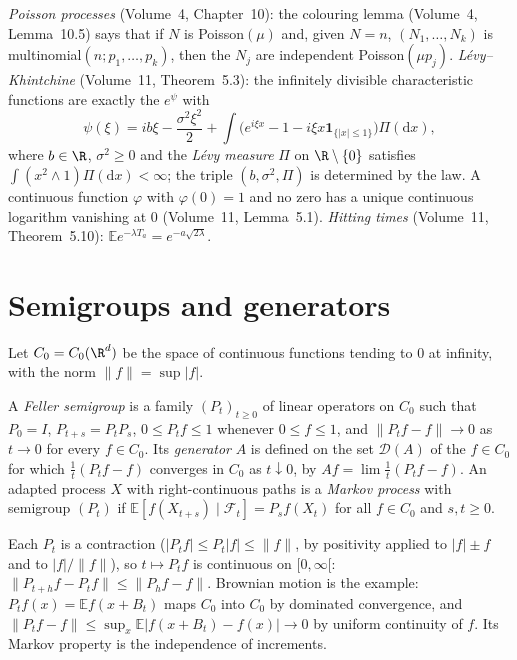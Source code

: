 \begin{reminder}
\emph{Poisson processes} (Volume~4, Chapter~10): the colouring lemma (Volume~4, Lemma~10.5) says that if $N$ is Poisson$(\mu)$ and, given $N=n$, $(N_1,\dots,N_k)$ is multinomial$(n;p_1,\dots,p_k)$, then the $N_j$ are
independent Poisson$(\mu p_j)$. \emph{L\'evy--Khintchine} (Volume~11, Theorem~5.3): the infinitely divisible characteristic functions are exactly the $e^{\psi}$ with
\[
\psi(\xi)=ib\xi-\frac{\sigma^2\xi^2}2+\int\bigl(e^{i\xi x}-1-i\xi x\mathbf 1_{\{|x|\le1\}}\bigr)\Pi(\mathrm dx),
\]
where $b\in\R$, $\sigma^2\ge0$ and the \emph{L\'evy measure} $\Pi$ on $\R\setminus\{0\}$ satisfies $\int(x^2\wedge1)\Pi(\mathrm dx)<\infty$; the triple $(b,\sigma^2,\Pi)$ is determined by the law. A continuous function
$\varphi$ with $\varphi(0)=1$ and no zero has a unique continuous logarithm vanishing at $0$ (Volume~11, Lemma~5.1). \emph{Hitting times} (Volume~11, Theorem~5.10): $\mathbb Ee^{-\lambda T_a}=e^{-a\sqrt{2\lambda}}$.
\end{reminder}

\section{Semigroups and generators}

Let $C_0=C_0(\R^d)$ be the space of continuous functions tending to $0$ at infinity, with the norm $\|f\|=\sup|f|$.

\begin{definition}\label{def:feller}
A \emph{Feller semigroup} is a family $(P_t)_{t\ge0}$ of linear operators on $C_0$ such that $P_0=I$, $P_{t+s}=P_tP_s$, $0\le P_tf\le1$ whenever $0\le f\le1$, and $\|P_tf-f\|\to0$ as $t\to0$ for every
$f\in C_0$. Its \emph{generator} $A$ is defined on the set $\mathcal D(A)$ of the $f\in C_0$ for which $\frac1t(P_tf-f)$ converges in $C_0$ as $t\downarrow0$, by $Af=\lim\frac1t(P_tf-f)$. An adapted process $X$ with
right-continuous paths is a \emph{Markov process} with semigroup $(P_t)$ if $\mathbb E[f(X_{t+s})\mid\mathcal F_t]=P_sf(X_t)$ for all $f\in C_0$ and $s,t\ge0$.
\end{definition}

Each $P_t$ is a contraction ($|P_tf|\le P_t|f|\le\|f\|$, by positivity applied to $|f|\pm f$ and to $|f|/\|f\|$), so $t\mapsto P_tf$ is continuous on $[0,\infty[$: $\|P_{t+h}f-P_tf\|\le\|P_hf-f\|$. Brownian
motion is the example: $P_tf(x)=\mathbb Ef(x+B_t)$ maps $C_0$ into $C_0$ by dominated convergence, and $\|P_tf-f\|\le\sup_x\mathbb E|f(x+B_t)-f(x)|\to0$ by uniform continuity of $f$. Its Markov property is the independence of
increments.


